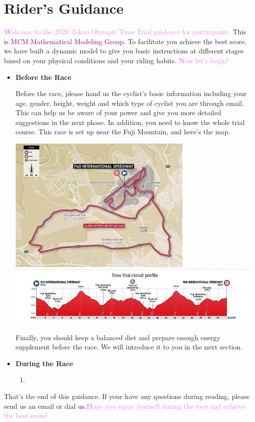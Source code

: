 \documentclass[12pt]{article}
\newcommand{\itembf}{\item \textbf}
\newcommand{\violetbf}[1]{\textcolor{violet}{\textbf #1}}
\theoremstyle{definition}
\theoremstyle{remark}
\numberwithin{equation}{section}
\begin{document}
	\section{Rider's Guidance}
	\violetbf{Welcome to the 2021 Tokyo Olympic Time Trial guidance for participants.} This is \textcolor{purple}{MCM Mathematical Modeling Group}. To facilitate you achieve the best score, we have built a dynamic model to give you basic instructions at different stages based on your physical conditions and your riding habits. \violetbf{Now let's begin!}
	\begin{itemize}
	\itembf {Before the Race}
		
			Before the race, please hand us the cyclist's basic information including your age, gender, height, weight and which type of cyclist you are through email. This can help us be aware of your power and give you more detailed suggestions in the next phase. In addition, you need to know the whole trial course. This race is set up near the Fuji Mountain, and here's the map.\cite{tokyo}

			\begin{center}
				\includegraphics[width=9cm]{1.jpg}\\
				\includegraphics[width=14cm]{3.jpg}
			\end{center}

			Finally, you should keep a balanced diet and prepare enough energy supplement before the race. We will introduce it to you in the next section.
	\itembf{During the Race}
	\begin{enumerate}	
		\itembf{}
	\end{enumerate}
	\end{itemize}
	That's the end of this guidance. If your have any questions during reading, please send us an email or dial us.\violetbf{Hope you enjoy yourself during the race and achieve the best score!}
\end{document}
